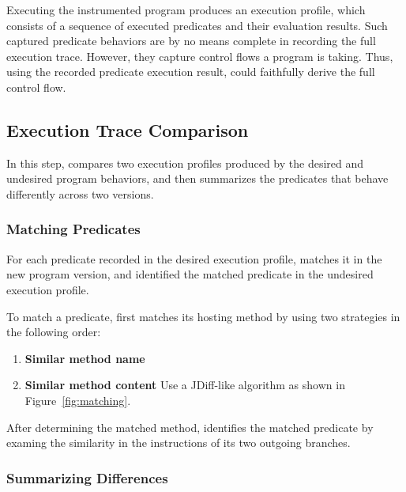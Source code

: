 Executing the instrumented program produces an execution profile,
which consists of a sequence of executed predicates and their
evaluation results. Such captured predicate behaviors are by
no means complete in recording the full execution trace. However,
they capture control flows a program is taking. Thus, using the
recorded predicate execution result, \ourtool could faithfully
derive the full control flow. 

\subsection{Execution Trace Comparison}
\label{sec:comparison}




In this step, \ourtool compares two execution profiles
produced by the desired and undesired program behaviors, and
then summarizes the predicates that behave differently
across two versions.

\subsubsection{Matching Predicates}

For each predicate recorded in the desired execution profile,
\ourtool matches it in the new program version, and identified
the matched predicate in the undesired execution profile.

To match a predicate, \ourtool first matches its hosting method
by using two strategies in the following order:

\begin{enumerate}
\item \textbf{Similar method name}
\item \textbf{Similar method content} Use a JDiff-like algorithm
as shown in Figure~\ref{fig:matching}.
\end{enumerate}


After determining the matched method, \ourtool identifies
the matched predicate by examing the similarity in the
instructions of its two outgoing branches.



\subsubsection{Summarizing Differences}

